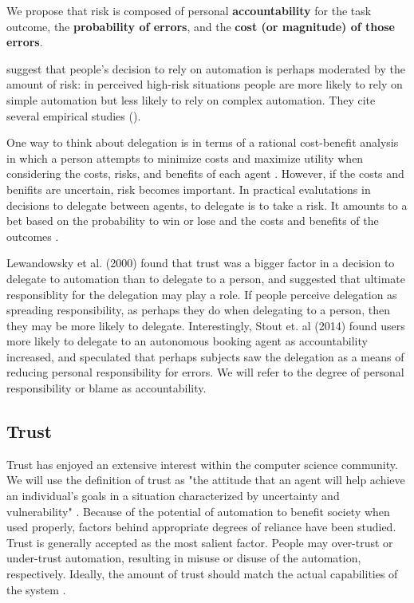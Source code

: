 \documentclass[letterpaper]{article} %
\begin{document}
We propose that risk is composed of personal \textbf{accountability} for the task outcome, the \textbf{probability of errors}, and the \textbf{cost (or magnitude) of those errors}.

\cite{Hoff-trust-2015} suggest that people's decision to rely on automation is perhaps moderated by the amount of risk: in perceived high-risk situations people are more likely to rely on simple automation but less likely to rely on complex automation. They cite several empirical studies (). 

One way to think about delegation is in terms of a rational cost-benefit analysis in which a person attempts to minimize costs and maximize utility when considering the costs, risks, and benefits of each agent \cite{castelfranchi-deleg-1998}. However, if the costs and benifits are uncertain, risk becomes important. In practical evalutations in decisions to delegate between agents, to delegate is to take a risk. It amounts to a bet based on the probability to win or lose and the costs and benefits of the outcomes \cite{castelfranchi-deleg-1998}. 

Lewandowsky et al. (2000) found that trust was a bigger factor in a decision to delegate to automation than to delegate to a person, and suggested that ultimate responsiblity for the delegation may play a role. If people perceive delegation as spreading responsibility, as perhaps they do when delegating to a person, then they may be more likely to delegate. Interestingly, Stout et. al (2014) found users more likely to delegate to an autonomous booking agent as accountability increased, and speculated that perhaps subjects saw the delegation as a means of reducing personal responsibility for errors. We will refer to the degree of personal responsibility or blame as accountability. 

\subsection{Trust}
Trust has enjoyed an extensive interest within the computer science community. We will use the definition of trust as "the attitude that an agent will help achieve an individual's goals in a situation characterized by uncertainty and vulnerability" \cite{lee}. Because of the potential of automation to benefit society when used properly, factors behind appropriate degrees of reliance have been studied. Trust is generally accepted as the most salient factor. People may over-trust or under-trust automation, resulting in misuse or disuse of the automation, respectively. Ideally, the amount of trust should match the actual capabilities of the system \cite{lee}. 
\end{document}
